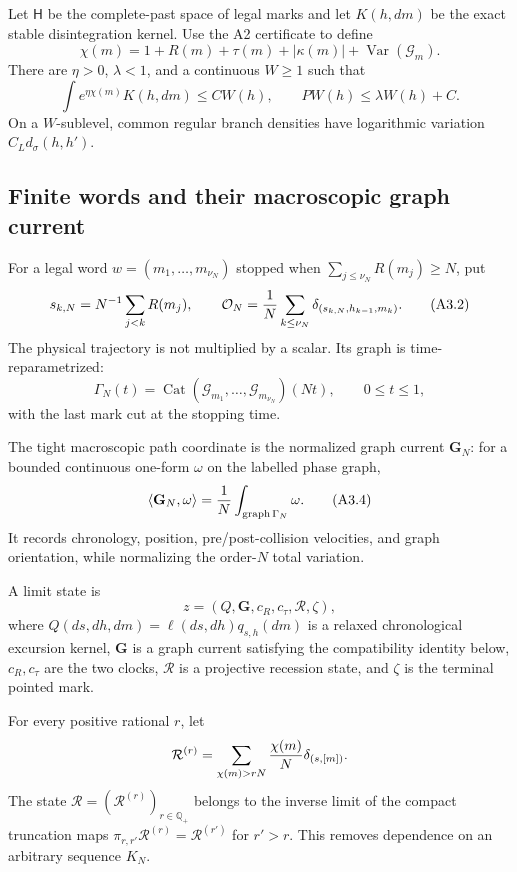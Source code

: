 Let $\mathsf H$ be the complete-past space of legal marks and let
$K(h,dm)$ be the exact stable disintegration kernel.  Use the A2 certificate
to define
\[
 \chi(m)=1+R(m)+\tau(m)+|\kappa(m)|+
         \operatorname{Var}(\mathcal G_m).
\]
There are $\eta>0$, $\lambda<1$, and a continuous $W\ge1$ such that
\[
 \int e^{\eta\chi(m)}K(h,dm)\le C W(h),
 \qquad PW(h)\le\lambda W(h)+C.                           \tag{A3.1}
\]
On a $W$-sublevel, common regular branch densities have logarithmic variation
$C_Ld_\sigma(h,h')$.

\subsection{Finite words and their macroscopic graph current}

For a legal word $w=(m_1,\ldots,m_{\nu_N})$ stopped when
$\sum_{j\le\nu_N}R(m_j)\ge N$, put
\[
 s_{k,N}=N^{-1}\sum_{j<k}R(m_j),\qquad
 \mathcal O_N={1\over N}\sum_{k\le\nu_N}
 \delta_{(s_{k,N},h_{k-1},m_k)}.                          \tag{A3.2}
\]
The physical trajectory is not multiplied by a scalar.  Its graph is
time-reparametrized:
\[
 \Gamma_N(t)=\operatorname{Cat}(\mathcal G_{m_1},\ldots,
 \mathcal G_{m_{\nu_N}})(Nt),\qquad0\le t\le1,            \tag{A3.3}
\]
with the last mark cut at the stopping time.

The tight macroscopic path coordinate is the normalized graph current
$\mathbf G_N$: for a bounded continuous one-form $\omega$ on the labelled
phase graph,
\[
 \langle\mathbf G_N,\omega\rangle
 ={1\over N}\int_{\operatorname{graph}\Gamma_N}\omega.    \tag{A3.4}
\]
It records chronology, position, pre/post-collision velocities, and graph
orientation, while normalizing the order-$N$ total variation.

A limit state is
\[
 z=(Q,\mathbf G,c_R,c_\tau,\mathcal R,\zeta),             \tag{A3.5}
\]
where $Q(ds,dh,dm)=\ell(ds,dh)q_{s,h}(dm)$ is a relaxed chronological
excursion kernel, $\mathbf G$ is a graph current satisfying the compatibility
identity below, $c_R,c_\tau$ are the two clocks, $\mathcal R$ is a projective
recession state, and $\zeta$ is the terminal pointed mark.

For every positive rational $r$, let
\[
 \mathcal R^{(r)}
 =\sum_{\chi(m)>rN}{\chi(m)\over N}
   \delta_{(s,[m])}.
\]
The state $\mathcal R=(\mathcal R^{(r)})_{r\in\mathbb Q_+}$ belongs to the
inverse limit of the compact truncation maps
$\pi_{r,r'}\mathcal R^{(r)}=\mathcal R^{(r')}$ for $r'>r$.
This removes dependence on an arbitrary sequence $K_N$.


